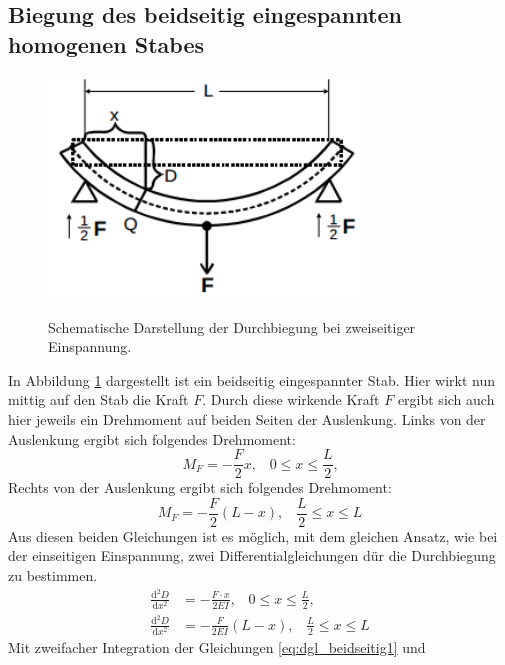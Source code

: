 \documentclass[
  bibliography=totoc,     %
  captions=tableheading,  %
  titlepage=firstiscover, %
]{scrartcl}
\begin{document}
\subsection{Biegung des beidseitig eingespannten homogenen Stabes}
\begin{figure}[H]
    \centering
    \caption{Schematische Darstellung der Durchbiegung bei zweiseitiger Einspannung. \cite{anleitung}}
    \includegraphics[width=0.75\textwidth]{V1032.png}
    \label{fig:1032}
\end{figure}
In Abbildung \ref{fig:1032} dargestellt ist ein beidseitig eingespannter Stab.
Hier wirkt nun mittig auf den Stab die Kraft $F$. Durch diese wirkende Kraft $F$
ergibt sich auch hier jeweils ein Drehmoment auf beiden Seiten der Auslenkung.
Links von der Auslenkung ergibt sich folgendes Drehmoment:
\begin{equation}
	M_F=-\frac{F}{2}x, \;\;\; 0\leqslant  x\leqslant\frac{L}{2}\text{,}
\label{eq:Drehmoment_links}
\end{equation}
Rechts von der Auslenkung ergibt sich folgendes Drehmoment:
\begin{equation}
	M_F=-\frac{F}{2}(L-x), \;\;\; \frac{L}{2}\leqslant  x\leqslant L
\end{equation}
Aus diesen beiden Gleichungen ist es möglich, mit dem gleichen Ansatz, wie bei
der einseitigen Einspannung, zwei Differentialgleichungen dür die Durchbiegung
zu bestimmen.
\begin{align}
	\frac{\mathup{d}^2D}{\mathup{d}x^2}&=-\frac{F\cdot x}{2EI}, \;\;\; 0\leqslant x\leqslant\frac{L}{2}\text{,}
    \label{eq:dgl_beidseitig1} \\
	\frac{\mathup{d}^2D}{\mathup{d}x^2}&=-\frac{F}{2EI}(L-x), \;\;\; \frac{L}{2}\leqslant x\leqslant L
	\label{eq:dgl_beidseitig}
\end{align}
Mit zweifacher Integration der Gleichungen \eqref{eq:dgl_beidseitig1} und
\end{document}

